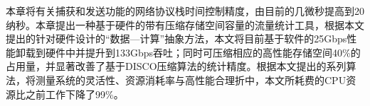 本章将有关捕获和发送功能的网络协议栈时间控制精度，由目前的几微秒提高到20纳秒。本章提出一种基于硬件的带有压缩存储空间容量的流量统计工具，根据本文提出的针对硬件设计的“数据---计算”抽象方法，本文将目前基于软件的25Gbps性能卸载到硬件中并提升到133Gbps吞吐；同时可压缩相应的高性能存储空间40\%的占用量，并显著改善了基于DISCO压缩算法的统计精度。根据本文提出的系列算法，将测量系统的灵活性、资源消耗率与高性能合理折中，本文所耗费的CPU资源比之前工作下降了99\%。















